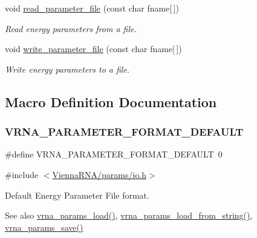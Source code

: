 \begin{DoxyCompactItemize}
void \mbox{\hyperlink{group__energy__parameters__rw_ga165a142a3c68fb6655c69ef4ab7cd749}{read\+\_\+parameter\+\_\+file}} (const char fname\mbox{[}$\,$\mbox{]})
\begin{DoxyCompactList}\small\item\em Read energy parameters from a file. \end{DoxyCompactList}\item 
void \mbox{\hyperlink{group__energy__parameters__rw_ga8a43459be386a7489feeab68dc2c6c76}{write\+\_\+parameter\+\_\+file}} (const char fname\mbox{[}$\,$\mbox{]})
\begin{DoxyCompactList}\small\item\em Write energy parameters to a file. \end{DoxyCompactList}\end{DoxyCompactItemize}


\subsection{Macro Definition Documentation}
\mbox{\label{group__energy__parameters__rw_ga2d46720ac5bf0e56ce0dbbff459667d2}} 
\subsubsection{\texorpdfstring{VRNA\_PARAMETER\_FORMAT\_DEFAULT}{VRNA\_PARAMETER\_FORMAT\_DEFAULT}}
{\footnotesize\ttfamily \#define V\+R\+N\+A\+\_\+\+P\+A\+R\+A\+M\+E\+T\+E\+R\+\_\+\+F\+O\+R\+M\+A\+T\+\_\+\+D\+E\+F\+A\+U\+LT~0}



{\ttfamily \#include $<$\mbox{\hyperlink{io_8h}{Vienna\+R\+N\+A/params/io.\+h}}$>$}



Default Energy Parameter File format. 

\begin{DoxySeeAlso}{See also}
\mbox{\hyperlink{group__energy__parameters__rw_gabb0583595c67094986ef90cb4f1c7555}{vrna\+\_\+params\+\_\+load()}}, \mbox{\hyperlink{group__energy__parameters__rw_gabcd9cc7040a6b633b56b1cbd6a14d68e}{vrna\+\_\+params\+\_\+load\+\_\+from\+\_\+string()}}, \mbox{\hyperlink{group__energy__parameters__rw_ga0de3731b3e4017c52bd678549f6c4ae5}{vrna\+\_\+params\+\_\+save()}} 
\end{DoxySeeAlso}


